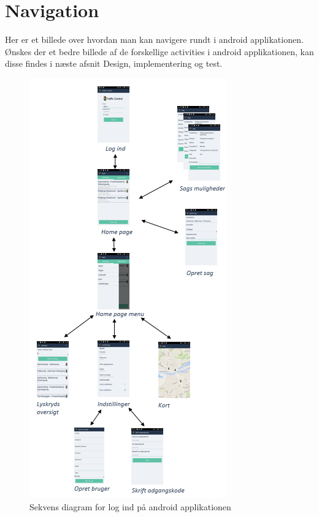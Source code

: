 \section{Navigation}
	Her er et billede over hvordan man kan navigere rundt i android applikationen. Ønskes der et bedre billede af de forskellige activities i android applikationen, kan disse findes i næste afsnit Design, implementering og test.
	\begin{figure} [!ht]
		\begin{center}
			\includegraphics[scale=1.6]{Android/Billeder/Navigation}
		\end{center}
		\caption{Sekvens diagram for log ind på android applikationen}
		\label{fig:Navigation i applikationen}
	\end{figure}
	\pagebreak
